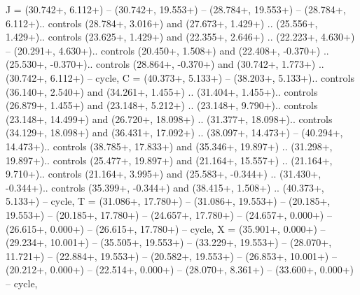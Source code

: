 {J} = {(30.742+\ctpXshift, 6.112+\ctpYshift) -- (30.742+\ctpXshift, 19.553+\ctpYshift) -- (28.784+\ctpXshift, 19.553+\ctpYshift) -- (28.784+\ctpXshift, 6.112+\ctpYshift).. controls (28.784+\ctpXshift, 3.016+\ctpYshift) and (27.673+\ctpXshift, 1.429+\ctpYshift) .. (25.556+\ctpXshift, 1.429+\ctpYshift).. controls (23.625+\ctpXshift, 1.429+\ctpYshift) and (22.355+\ctpXshift, 2.646+\ctpYshift) .. (22.223+\ctpXshift, 4.630+\ctpYshift) -- (20.291+\ctpXshift, 4.630+\ctpYshift).. controls (20.450+\ctpXshift, 1.508+\ctpYshift) and (22.408+\ctpXshift, -0.370+\ctpYshift) .. (25.530+\ctpXshift, -0.370+\ctpYshift).. controls (28.864+\ctpXshift, -0.370+\ctpYshift) and (30.742+\ctpXshift, 1.773+\ctpYshift) .. (30.742+\ctpXshift, 6.112+\ctpYshift) -- cycle},
{C} = {(40.373+\ctpXshift, 5.133+\ctpYshift) -- (38.203+\ctpXshift, 5.133+\ctpYshift).. controls (36.140+\ctpXshift, 2.540+\ctpYshift) and (34.261+\ctpXshift, 1.455+\ctpYshift) .. (31.404+\ctpXshift, 1.455+\ctpYshift).. controls (26.879+\ctpXshift, 1.455+\ctpYshift) and (23.148+\ctpXshift, 5.212+\ctpYshift) .. (23.148+\ctpXshift, 9.790+\ctpYshift).. controls (23.148+\ctpXshift, 14.499+\ctpYshift) and (26.720+\ctpXshift, 18.098+\ctpYshift) .. (31.377+\ctpXshift, 18.098+\ctpYshift).. controls (34.129+\ctpXshift, 18.098+\ctpYshift) and (36.431+\ctpXshift, 17.092+\ctpYshift) .. (38.097+\ctpXshift, 14.473+\ctpYshift) -- (40.294+\ctpXshift, 14.473+\ctpYshift).. controls (38.785+\ctpXshift, 17.833+\ctpYshift) and (35.346+\ctpXshift, 19.897+\ctpYshift) .. (31.298+\ctpXshift, 19.897+\ctpYshift).. controls (25.477+\ctpXshift, 19.897+\ctpYshift) and (21.164+\ctpXshift, 15.557+\ctpYshift) .. (21.164+\ctpXshift, 9.710+\ctpYshift).. controls (21.164+\ctpXshift, 3.995+\ctpYshift) and (25.583+\ctpXshift, -0.344+\ctpYshift) .. (31.430+\ctpXshift, -0.344+\ctpYshift).. controls (35.399+\ctpXshift, -0.344+\ctpYshift) and (38.415+\ctpXshift, 1.508+\ctpYshift) .. (40.373+\ctpXshift, 5.133+\ctpYshift) -- cycle},
{T} = {(31.086+\ctpXshift, 17.780+\ctpYshift) -- (31.086+\ctpXshift, 19.553+\ctpYshift) -- (20.185+\ctpXshift, 19.553+\ctpYshift) -- (20.185+\ctpXshift, 17.780+\ctpYshift) -- (24.657+\ctpXshift, 17.780+\ctpYshift) -- (24.657+\ctpXshift, 0.000+\ctpYshift) -- (26.615+\ctpXshift, 0.000+\ctpYshift) -- (26.615+\ctpXshift, 17.780+\ctpYshift) -- cycle},
{X} = {(35.901+\ctpXshift, 0.000+\ctpYshift) -- (29.234+\ctpXshift, 10.001+\ctpYshift) -- (35.505+\ctpXshift, 19.553+\ctpYshift) -- (33.229+\ctpXshift, 19.553+\ctpYshift) -- (28.070+\ctpXshift, 11.721+\ctpYshift) -- (22.884+\ctpXshift, 19.553+\ctpYshift) -- (20.582+\ctpXshift, 19.553+\ctpYshift) -- (26.853+\ctpXshift, 10.001+\ctpYshift) -- (20.212+\ctpXshift, 0.000+\ctpYshift) -- (22.514+\ctpXshift, 0.000+\ctpYshift) -- (28.070+\ctpXshift, 8.361+\ctpYshift) -- (33.600+\ctpXshift, 0.000+\ctpYshift) -- cycle},
